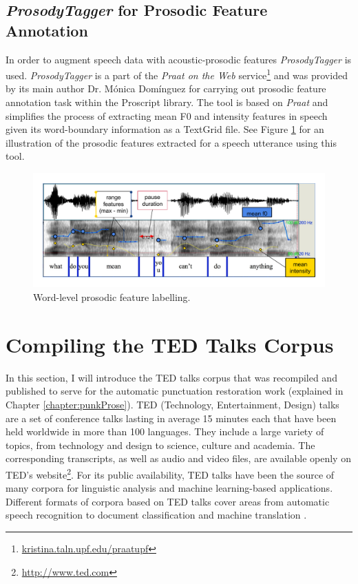 \subsection*{\textit{ProsodyTagger} for Prosodic Feature Annotation}
In order to augment speech data with acoustic-prosodic features \textit{ProsodyTagger} is used. \textit{ProsodyTagger} \citep{tagger} is a part of the \textit{Praat on the Web} service\footnote{\url{kristina.taln.upf.edu/praatupf}} \citep{praatontheweb} and was provided by its main author Dr. Mónica Domínguez for carrying out prosodic feature annotation task within the Proscript library. The tool is based on \textit{Praat} and simplifies the process of extracting mean F0 and intensity features in speech given its word-boundary information as a TextGrid file. See Figure \ref{corpusWorks:figure:pros_features} for an illustration of the prosodic features extracted for a speech utterance using this tool. 

\begin{figure}
\centering\includegraphics[width=\linewidth]{img/pros_features.pdf}
\caption{Word-level prosodic feature labelling.}
\label{corpusWorks:figure:pros_features}
\end{figure}

\section{Compiling the TED Talks Corpus}
\label{corpusWorks:ted}

In this section, I will introduce the TED talks corpus that was recompiled and published to serve for the automatic punctuation restoration work (explained in Chapter \ref{chapter:punkProse}). TED (Technology, Entertainment, Design) talks are a set of conference talks lasting in average 15 minutes each that have been held worldwide in more than 100 languages. They include a large variety of topics, from technology and design to science, culture and academia.  The corresponding transcripts, as well as audio and video files, are available openly on TED's website\footnote{\url{http://www.ted.com}}. For its public availability, TED talks have been the source of many corpora for linguistic analysis and machine learning-based applications. Different formats of corpora based on TED talks cover areas from automatic speech recognition \citep{tedlium} to document classification \citep{Hermann:2014:ACLphil} and machine translation \citep{cettoloEtAl:EAMT2012}. 

